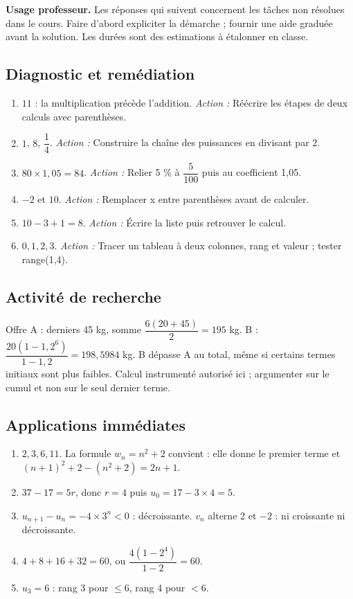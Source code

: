 \label{C01-CORR}
\textbf{Usage professeur.} Les réponses qui suivent concernent les tâches non résolues dans le cours. Faire d’abord expliciter la démarche ; fournir une aide graduée avant la solution. Les durées sont des estimations à étalonner en classe.
\subsection*{Diagnostic et remédiation}
\begin{enumerate}
\item $11$ : la multiplication précède l’addition. \textit{Action :} Réécrire les étapes de deux calculs avec parenthèses.
\item $1$, $8$, $\dfrac{1}{4}$. \textit{Action :} Construire la chaîne des puissances en divisant par 2.
\item $80\times1{,}05=84$. \textit{Action :} Relier 5 \% à $\dfrac{5}{100}$ puis au coefficient 1,05.
\item $-2$ et $10$. \textit{Action :} Remplacer x entre parenthèses avant de calculer.
\item $10-3+1=8$. \textit{Action :} Écrire la liste puis retrouver le calcul.
\item $0,1,2,3$. \textit{Action :} Tracer un tableau à deux colonnes, rang et valeur ; tester range(1,4).
\end{enumerate}
\subsection*{Activité de recherche}
Offre A : derniers 45 kg, somme $\dfrac{6(20+45)}{2}=195$ kg. B : $\dfrac{20(1-1{,}2^6)}{1-1{,}2}=198{,}5984$ kg. B dépasse A au total, même si certains termes initiaux sont plus faibles. Calcul instrumenté autorisé ici ; argumenter sur le cumul et non sur le seul dernier terme.
\subsection*{Applications immédiates}
\begin{enumerate}
\item $2,3,6,11$. La formule $w_n=n^2+2$ convient : elle donne le premier terme et $(n+1)^2+2-(n^2+2)=2n+1$.
\item $37-17=5r$, donc $r=4$ puis $u_0=17-3\times4=5$.
\item $u_{n+1}-u_n=-4\times3^n<0$ : décroissante. $v_n$ alterne 2 et $-2$ : ni croissante ni décroissante.
\item $4+8+16+32=60$, ou $\dfrac{4(1-2^4)}{1-2}=60$.
\item $u_3=6$ : rang 3 pour $\leq6$, rang 4 pour $<6$.
\end{enumerate}
